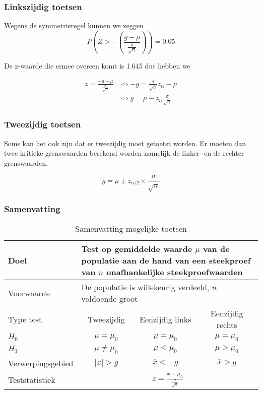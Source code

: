 \documentclass[aspectratio=169]{beamer}
\begin{document}
\begin{frame}
  \frametitle{Linkszijdig toetsen}
  Wegens de symmetrieregel kunnen we zeggen
  \[ P\left(Z > - \left( \frac{g - \mu}{\frac{\sigma}{\sqrt{n}}} \right) \right) = 0.05 \]
  
  De z-waarde die ermee overeen komt is 1.645 dus hebben we
  
  \begin{align*}
  z = \frac{-g + \mu}{\frac{\sigma}{\sqrt{n}}} &\Leftrightarrow -g = \frac{\sigma}{\sqrt{n}} z_\alpha - \mu \\
  & \Leftrightarrow g = \mu - z_\alpha \frac{\sigma}{\sqrt{n}}
  \end{align*}
  
\end{frame}

\begin{frame}
  \frametitle{Tweezijdig toetsen}
  Soms kan het ook zijn dat er tweezijdig moet getoetst worden. Er moeten dan twee kritieke grenswaarden berekend worden namelijk de linker- en de rechter grenswaarden.
  
  \begin{equation}
  g = \mu \pm z_{\alpha/2} \times \frac{\sigma}{\sqrt{n}}
  \label{eq:kritiekeGrenswaarde}
  \end{equation}
\end{frame}

\begin{frame}[plain]
  \frametitle{Samenvatting}
  
  \begin{table}
    \centering
    \begin{tabular}{l|ccc}
      \toprule
      Doel              & \multicolumn{3}{l}{\parbox{.7\textwidth}{Test op gemiddelde waarde $\mu$ van de populatie aan de hand van een steekproef van $n$ onafhankelijke steekproefwaarden}} \\
      \midrule
      Voorwaarde        & \multicolumn{3}{l}{\parbox{.7\textwidth}{De populatie is willekeurig verdeeld, $n$ voldoende groot}} \\
      \midrule
      Type test         & Tweezijdig           & Eenzijdig links & Eenzijdig rechts \\
      \midrule
      $H_{0}$           & $\mu = \mu_{0}$      & $\mu = \mu_{0}$ & $\mu = \mu_{0}$  \\
      $H_{1}$           & $\mu \neq \mu_{0}$   & $\mu < \mu_{0}$ & $\mu > \mu_{0}$  \\
      Verwerpingsgebied & $\left|\overline{x}\right| > g$ & $\overline{x}< -g $        & $\overline{x}>g$            \\
      Teststatistiek    & \multicolumn{3}{c}{$z = \frac{\overline{x} - \mu_{0}}{\frac{\sigma}{\sqrt{n}}}$} \\
      \bottomrule
    \end{tabular}
    \caption{Samenvatting mogelijke toetsen}
    \label{tab:toetsingsprocedures}
  \end{table}
\end{frame}
\end{document}
